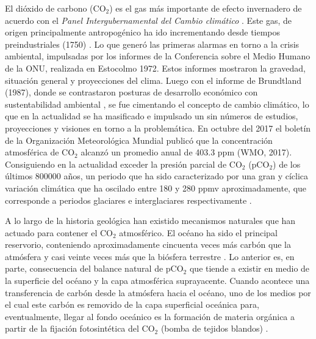 
El dióxido de carbono (CO$_2$) es el gas m\'as importante de efecto invernadero de acuerdo con el \textit{Panel Intergubernamental del Cambio climático} \citep{IPCC2014}. 
Este gas, de origen principalmente antropogénico ha ido incrementando desde tiempos preindustriales (1750) \citep{luthi2008high}. Lo que generó las primeras alarmas en torno a la crisis ambiental, impulsadas por los informes de la Conferencia sobre el Medio Humano de la ONU, realizada en Estocolmo 1972. Estos informes mostraron la gravedad, situación general y proyecciones del clima. Luego con el informe de Brundtland (1987), donde se contrastaron posturas de desarrollo económico con sustentabilidad ambiental \citep{Pierri2005}, se fue cimentando el concepto de cambio climático, lo que en la actualidad se ha masificado e impulsado un sin números de estudios, proyecciones y visiones en torno a la problemática. En octubre del 2017 el boletín de la Organización Meteorológica Mundial publicó que la concentración atmosférica de CO$_{2}$ alcanzó un promedio anual de 403.3 ppm (WMO, 2017). Consiguiendo en la actualidad exceder la presi\'on parcial de CO$_2$ (pCO$_2$) de los últimos 800000 años, un periodo que ha sido caracterizado por una gran y cíclica variación climática que ha oscilado entre 180 y 280 ppmv aproximadamente, que corresponde a periodos glaciares e interglaciares respectivamente \citep{harrison2000role,ferrari2014antarctic}. 

A lo largo de la historia geológica han existido mecanismos naturales que han actuado para contener el CO$_2$ atmosférico. El océano ha sido el principal reservorio, conteniendo aproximadamente cincuenta veces más carbón que la atmósfera y casi veinte veces más que la biósfera terrestre \citep{broecker1980modeling}. Lo anterior es, en parte, consecuencia del balance natural de pCO$_2$ que tiende a existir en medio de la superficie del océano y la capa atmosférica suprayacente. Cuando acontece una transferencia de carbón desde la atmósfera hacia el océano, uno de los medios por el cual este carbón es removido de la capa superficial oceánica para, eventualmente, llegar al fondo oceánico es la formación de materia orgánica a partir de la fijación fotosintética del CO$_2$ (bomba de tejidos blandos) \citep{falkowski1998biogeochemical,anderson2002southern,sigman2003biological,kohfeld2005role}. 

